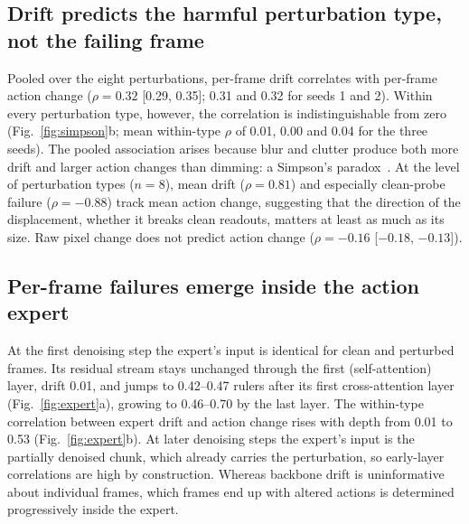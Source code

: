 \documentclass[conference]{IEEEtran}
\begin{document}
\subsection{Drift predicts the harmful perturbation type, not the failing frame}
Pooled over the eight perturbations, per-frame drift correlates with per-frame action change ($\rho = 0.32$ [0.29, 0.35]; 0.31 and 0.32 for seeds 1 and 2). Within every perturbation type, however, the correlation is indistinguishable from zero (Fig.~\ref{fig:simpson}b; mean within-type $\rho$ of 0.01, 0.00 and 0.04 for the three seeds). The pooled association arises because blur and clutter produce both more drift and larger action changes than dimming: a Simpson's paradox~\cite{simpson1951}. At the level of perturbation types ($n=8$), mean drift ($\rho = 0.81$) and especially clean-probe failure ($\rho = -0.88$) track mean action change, suggesting that the direction of the displacement, whether it breaks clean readouts, matters at least as much as its size. Raw pixel change does not predict action change ($\rho = -0.16$ [$-0.18$, $-0.13$]).


\subsection{Per-frame failures emerge inside the action expert}
At the first denoising step the expert's input is identical for clean and perturbed frames. Its residual stream stays unchanged through the first (self-attention) layer, drift 0.01, and jumps to 0.42--0.47 rulers after its first cross-attention layer (Fig.~\ref{fig:expert}a), growing to 0.46--0.70 by the last layer. The within-type correlation between expert drift and action change rises with depth from 0.01 to 0.53 (Fig.~\ref{fig:expert}b). At later denoising steps the expert's input is the partially denoised chunk, which already carries the perturbation, so early-layer correlations are high by construction. Whereas backbone drift is uninformative about individual frames, which frames end up with altered actions is determined progressively inside the expert.
\end{document}
